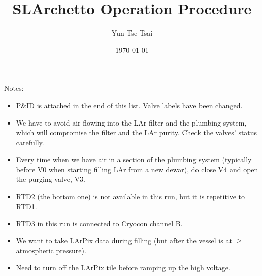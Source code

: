 \documentclass[letterpaper,11pt]{article}
\begin{document}
\title{\textbf{SLArchetto Operation Procedure}}
\author{Yun-Tse Tsai}
\date{\today}

\maketitle


Notes:
\begin{itemize}
\setlength\itemsep{-0.2em}
\item P\&ID is attached in the end of this list. Valve labels have been changed.
\item We have to avoid air flowing into the LAr filter and the plumbing system, which will compromise the filter and the LAr purity.  Check the valves' status carefully.
\item Every time when we have air in a section of the plumbing system (typically before V0 when starting filling LAr from a new dewar), do close V4 and open the purging valve, V3.
\item RTD2 (the bottom one) is not available in this run, but it is repetitive to RTD1.
\item RTD3 in this run is connected to Cryocon channel B.
\item We want to take LArPix data during filling (but after the vessel is at $\ge$ atmospheric pressure).
\item Need to turn off the LArPix tile before ramping up the high voltage.
\end{itemize}

\end{document}
